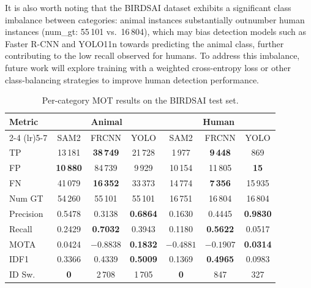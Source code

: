 \documentclass[11pt]{article}
\begin{document}
It is also worth noting that the BIRDSAI dataset exhibits a significant class imbalance between categories: 
animal instances substantially outnumber human instances (num\_gt: 55\,101 vs.\ 16\,804), 
which may bias detection models such as Faster R-CNN and YOLO11n towards predicting the animal class, 
further contributing to the low recall observed for humans. 
To address this imbalance, future work will explore training with a weighted cross-entropy loss 
or other class-balancing strategies to improve human detection performance.
\begin{table}[htbp]
\centering
\begin{tabular}{l ccc ccc}
\toprule
\textbf{Metric} & \multicolumn{3}{c}{\textbf{Animal}} & \multicolumn{3}{c}{\textbf{Human}} \\
\cmidrule(lr){2-4} \cmidrule(lr){5-7}
 & SAM2 & FRCNN & YOLO & SAM2 & FRCNN & YOLO \\
\midrule
TP        & 13\,181          & \textbf{38\,749} & 21\,728          & 1\,977           & \textbf{9\,448}  & 869     \\
FP        & \textbf{10\,880} & 84\,739          & 9\,929           & 10\,154          & 11\,805          & \textbf{15} \\
FN        & 41\,079          & \textbf{16\,352} & 33\,373          & 14\,774          & \textbf{7\,356}  & 15\,935 \\
Num GT    & 54\,260          & 55\,101          & 55\,101          & 16\,751          & 16\,804          & 16\,804 \\
Precision & 0.5478           & 0.3138           & \textbf{0.6864}  & 0.1630           & 0.4445           & \textbf{0.9830} \\
Recall    & 0.2429           & \textbf{0.7032}  & 0.3943           & 0.1180           & \textbf{0.5622}  & 0.0517  \\
MOTA      & 0.0424           & $-0.8838$        & \textbf{0.1832}  & $-0.4881$        & $-0.1907$        & \textbf{0.0314} \\
IDF1      & 0.3366           & 0.4339           & \textbf{0.5009}  & 0.1369           & \textbf{0.4965}  & 0.0983  \\
ID Sw.    & \textbf{0}       & 2\,708           & 1\,705           & \textbf{0}       & 847              & 327     \\
\bottomrule
\end{tabular}
\caption{Per-category MOT results on the BIRDSAI test set.}
\label{tab:mot-per-category}
\end{table}
\end{document}
